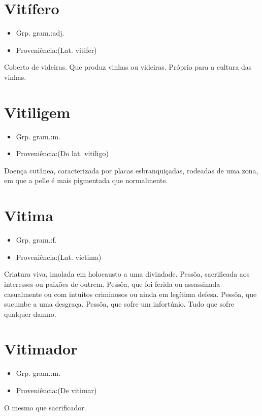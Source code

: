 \documentclass{article}
\begin{document}
\section{Vitífero}
\begin{itemize}
\item {Grp. gram.:adj.}
\end{itemize}
\begin{itemize}
\item {Proveniência:(Lat. \textunderscore vitifer\textunderscore )}
\end{itemize}
Coberto de videiras.
Que produz vinhas ou videiras.
Próprio para a cultura das vinhas.
\section{Vitiligem}
\begin{itemize}
\item {Grp. gram.:m.}
\end{itemize}
\begin{itemize}
\item {Proveniência:(Do lat. \textunderscore vitiligo\textunderscore )}
\end{itemize}
Doença cutânea, caracterizada por placas esbranquiçadas, rodeadas de uma zona, em que a pelle é mais pigmentada que normalmente.
\section{Vitima}
\begin{itemize}
\item {Grp. gram.:f.}
\end{itemize}
\begin{itemize}
\item {Proveniência:(Lat. \textunderscore victima\textunderscore )}
\end{itemize}
Criatura viva, imolada em holocausto a uma divindade.
Pessôa, sacrificada aos interesses ou paixões de outrem.
Pessôa, que foi ferida ou assassinada casualmente ou com intuitos criminosos ou ainda em legítima defesa.
Pessôa, que sucumbe a uma desgraça.
Pessôa, que sofre um infortúnio.
Tudo que sofre qualquer damno.
\section{Vitimador}
\begin{itemize}
\item {Grp. gram.:m.}
\end{itemize}
\begin{itemize}
\item {Proveniência:(De \textunderscore vitimar\textunderscore )}
\end{itemize}
O mesmo que \textunderscore sacrificador\textunderscore .
\end{document}
